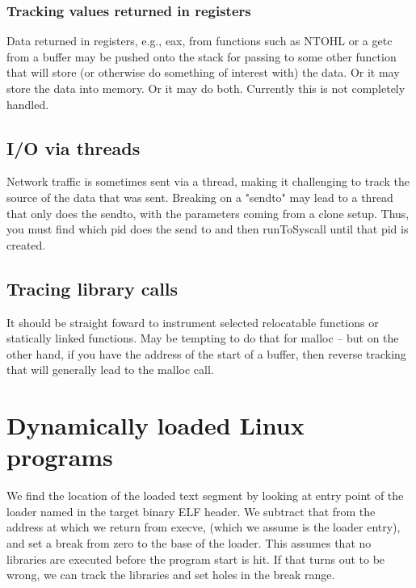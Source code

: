 \documentclass[titlepage]{article}
\begin{document}
\begin{appendices}
\subsubsection{Tracking values returned in registers}
Data returned in registers, e.g., eax, from functions such as NTOHL or a getc from a buffer may be pushed onto the stack for passing to some
other function that will store (or otherwise do something of interest with) the data.  Or it may store the data into memory.  Or it may do both.
Currently this is not completely handled.

\subsection{I/O via threads}
Network traffic is sometimes sent via a thread, making it challenging to track the source of the data that was sent.  Breaking on a "sendto" may
lead to a thread that only does the sendto, with the parameters coming from a clone setup.  Thus, you must find which pid does the send to and then
runToSyscall until that pid is created.

\subsection{Tracing library calls}
It should be straight foward to instrument selected relocatable functions or statically linked functions.
May be tempting to do that for malloc -- but on the other hand, if you have the address of the start of a buffer, then reverse tracking that
will generally lead to the malloc call.

\section{Dynamically loaded Linux programs}
We find the location of the loaded text segment by looking at entry point of the loader named in the target binary ELF header.  We subtract that from the address
at which we return from execve, (which we assume is the loader entry), and set a break from zero to the base of the loader.  This assumes that no libraries are
executed before the program start is hit.  If that turns out to be wrong, we can track the libraries and set holes in the break range.



\end{appendices}
\end{document}
